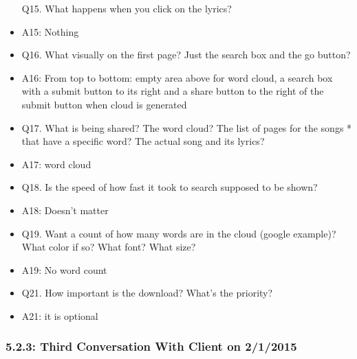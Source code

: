 \documentclass[]{article}
\begin{document}
\begin{itemize}
  Q15. What happens when you click on the lyrics?
\item
  A15: Nothing
\item
  Q16. What visually on the first page? Just the search box and the go
  button?
\item
  A16: From top to bottom: empty area above for word cloud, a search box
  with a submit button to its right and a share button to the right of
  the submit button when cloud is generated
\item
  Q17. What is being shared? The word cloud? The list of pages for the
  songs * that have a specific word? The actual song and its lyrics?
\item
  A17: word cloud
\item
  Q18. Is the speed of how fast it took to search supposed to be shown?
\item
  A18: Doesn't matter
\item
  Q19. Want a count of how many words are in the cloud (google example)?
  What color if so? What font? What size?
\item
  A19: No word count
\item
  Q21. How important is the download? What's the priority?
\item
  A21: it is optional
\end{itemize}

\subsubsection{5.2.3: Third Conversation With Client on
2/1/2015}\label{third-conversation-with-client-on-212015}
\end{document}
